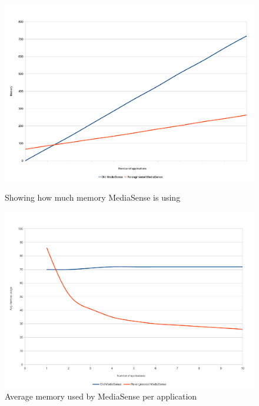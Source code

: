 \clearpage
\begin{figure}[H]
		\centering
    	\includegraphics[scale=0.50]{part_7/test_results/memory.pdf}
    	\caption{Showing how much memory MediaSense is using}
    	\includegraphics[scale=0.50]{part_7/test_results/avg_memory.pdf}
    	\caption{Average memory used by MediaSense per application}
\end{figure}



